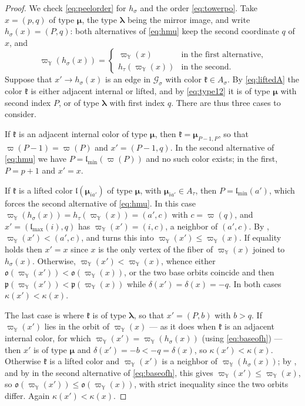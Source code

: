 \documentclass[12pt]{article}
\theoremstyle{definition}
\newcommand{\pset}{A}                  %
\newcommand{\orb}{\mathfrak{o}}
\newcommand{\pstn}{\mathfrak{p}}
\newcommand{\YY}{\mathbb{Y}}  %
\newcommand{\Gc}{\mathcal{G}}          %
\newcommand{\blam}{\boldsymbol{\lambda}}   %
\newcommand{\bmu}{\boldsymbol{\mu}}        %
\newcommand{\prj}{\varpi}                  %
\newcommand{\prjY}{\varpi_{\YY}}           %
\newcommand{\lmin}{\mathfrak{l}_{\min}}    %
\newcommand{\lmax}{\mathfrak{l}_{\max}}    %
\newcommand{\cl}{\mathfrak{l}}             %
\newcommand{\clr}{\mathfrak{k}}            %
\begin{document}
\begin{proof}
We check \eqref{eq:peelorder} for $h_\sigma$ and the order
\eqref{eq:towerpo}.
Take $x = (p,q)$ of type $\bmu$, the type $\blam$ being the mirror image,
and write $h_\sigma(x) = (P,q)$: both alternatives of \eqref{eq:hmu} keep
the second coordinate $q$ of $x$, and
\begin{equation}\label{eq:baseofh}
   \prjY(h_\sigma(x)) =
   \begin{cases}
      \prjY(x) & \text{in the first alternative},\\
      h_\tau(\prjY(x)) & \text{in the second}.
   \end{cases}
\end{equation}
Suppose that $x'\to h_\sigma(x)$ is an edge in $\Gc_\sigma$ with color
$\clr\in \pset_\sigma$. By \eqref{eq:liftedA} the color $\clr$ is either
adjacent internal or lifted, and by \eqref{eq:type12} it is of type
$\bmu$ with second index $P$, or of type $\blam$ with first index $q$.
There are thus three cases to consider.

If $\clr$ is an adjacent internal color of type $\bmu$, then $\clr=\bmu_{P-1,P}$, so that
$\prj(P-1) = \prj(P)$ and $x' = (P-1,q)$. In the second alternative of
\eqref{eq:hmu} we have $P = \lmin(\prj(P))$ and no such color exists; in
the first, $P = p+1$ and $x' = x$.

If $\clr$ is a lifted color $\cl(\bmu_{ia'})$ of type $\bmu$, with $\bmu_{ia'} \in
\pset_\tau$, then $P = \lmin(a')$, which forces the second alternative of \eqref{eq:hmu}.
In this case $\prjY(h_\sigma(x)) = h_\tau(\prjY(x)) = (a',c)$ with $c
= \prj(q)$, and $x' = (\lmax(i),q)$ has $\prjY(x') = (i,c)$, a neighbor of
$(a',c)$. By , $\prjY(x') < (a',c)$, and
 turns this into $\prjY(x') \le \prjY(x)$. If equality holds
then $x'=x$ since $x$ is the only vertex of the fiber of $\prjY(x)$ joined to
$h_\sigma(x)$. Otherwise, $\prjY(x') < \prjY(x)$, whence either
$\orb(\prjY(x')) < \orb(\prjY(x))$, or the two base orbits coincide and
then $\pstn(\prjY(x')) < \pstn(\prjY(x))$ while $\delta(x') = \delta(x) =
-q$. In both cases $\kappa(x') < \kappa(x)$.

The last case is where $\clr$ is of type $\blam$, so that $x' = (P,b)$ with $b
> q$. If $\prjY(x')$ lies in the orbit of $\prjY(x)$ --- as it does when $\clr$
is an adjacent internal color, for which $\prjY(x') = \prjY(h_\sigma(x))$ (using
\eqref{eq:baseofh}) --- then $x'$ is of type $\bmu$ and $\delta(x') = -b <
-q = \delta(x)$, so $\kappa(x') < \kappa(x)$. Otherwise $\clr$ is a lifted color and
$\prjY(x')$ is a neighbor of $\prjY(h_\sigma(x))$; by ,
and by  in the second alternative of
\eqref{eq:baseofh}, this gives $\prjY(x') \le \prjY(x)$, so
$\orb(\prjY(x')) \le \orb(\prjY(x))$, with strict inequality since the two
orbits differ. Again $\kappa(x') < \kappa(x)$.


\end{proof}
\end{document}
